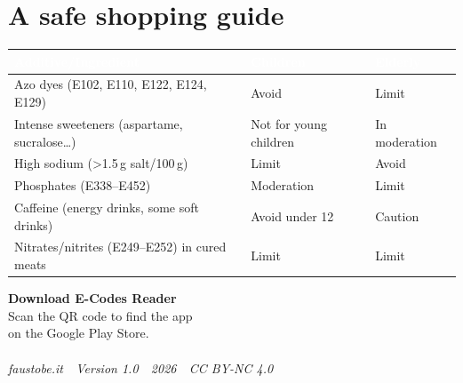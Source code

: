 \documentclass[a5paper,12pt,oneside,openany]{book}
\begin{document}
\section{A safe shopping guide}

{\small
\begin{tabularx}{\textwidth}{|L|L|L|}
\hline
{}
\textcolor{white}{\textbf{Additive/Ingredient}}
  & \textcolor{white}{\textbf{Children}}
  & \textcolor{white}{\textbf{Elderly}} \\
\hline
Azo dyes (E102, E110, E122, E124, E129) & Avoid & Limit \\
\hline
Intense sweeteners (aspartame, sucralose\ldots) & Not for young children & In moderation \\
\hline
High sodium (\textgreater1.5\,g salt/100\,g) & Limit & Avoid \\
\hline
Phosphates (E338--E452) & Moderation & Limit \\
\hline
Caffeine (energy drinks, some soft drinks) & Avoid under 12 & Caution \\
\hline
Nitrates/nitrites (E249--E252) in cured meats & Limit & Limit \\
\hline
\end{tabularx}
}

\cleardoublepage
\thispagestyle{empty}
\begin{center}
\vspace*{3cm}
{\large\bfseries\color{verdescuro} Download E-Codes Reader}\\[0.8cm]
{\normalsize Scan the QR code to find the app\\
on the Google Play Store.}\\[1.5cm]
\\[1.5cm]
\textcolor{grigioscuro}{\footnotesize\textit{faustobe.it\ \textbullet\ Version 1.0\ \textbullet\ 2026\ \textbullet\ CC BY-NC 4.0}}
\end{center}
\end{document}

